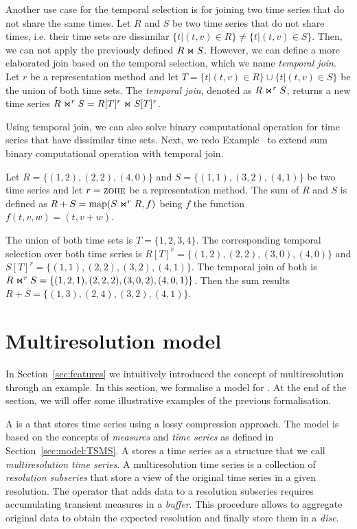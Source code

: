 Another use case for the temporal selection is for joining two time
series that do not share the same times. Let $R$ and $S$ be two time
series that do not share times, i.e. their time sets are dissimilar
$\{t | (t,v) \in R\} \neq \{t | (t,v) \in S\}$. Then, we can not apply
the previously defined $R \Join S$.  However, we can define a more
elaborated join based on the temporal selection, which we name
\emph{temporal join}.  Let $r$ be a representation method and let
$T=\{t | (t,v) \in R\} \cup \{t | (t,v) \in S\}$ be the union of both
time sets.  The \emph{temporal join}, denoted as $R \Join^r S$,
returns a new time series $R \Join^r S = R[T]^r \Join S[T]^r$.

Using temporal join, we can also solve binary computational operation
for time series that have dissimilar time sets. Next, we redo
Example~\label{ex:model:sum} to extend sum binary computational
operation with temporal join.

\begin{example}
  \label{ex:model:sumtemporal}
  Let $R=\{(1,2), (2,2), (4,0)\}$ and $S=\{(1,1), (3,2), (4,1)\}$ be
  two time series and let $r=\zohe{}$ be a representation method.  
  The sum of $R$ and $S$ is defined as $R+S=\operatorname*{map}(S\Join^r R, f)$ being
  $f$ the function $f(t,v,w)=(t,v+ w)$.

  The union of both time sets is $T=\{1,2,3,4\}$. The corresponding
  temporal selection over both time series is $R[T]^r=\{
  (1,2),\allowbreak (2,2), (3,0),\allowbreak (4,0)\}$ and
  $S[T]^r=\{(1,1),\allowbreak (2,2),\allowbreak (3,2), (4,1)\}$.  The
  temporal join of both is $R \Join^r S=\{ (1,2,1),\allowbreak (2,2,2), (3,0,2),
  (4,0,1)\}$.  Then the sum results $R+S= \{(1,3),\allowbreak (2,4), (3,2),
  (4,1)\}$.
\end{example}




\section{Multiresolution model}
\label{sec:MTSMS}

In Section~\ref{sec:features} we intuitively introduced the concept of
multiresolution through an example. In this section, we formalise a
model for . At the end of the section, we will offer some
illustrative examples of the previous formalisation.

A  is a  that stores time series using a lossy
compression approach. The  model is based on the concepts
of \emph{measures} and \emph{time series} as defined in
Section~\ref{sec:model:TSMS}.  A  stores a time series as
a structure that we call \emph{multiresolution time series}. A
multiresolution time series is a collection of \emph{resolution
  subseries} that store a view of the original time series in a given
resolution. The operator that adds data to a resolution subseries
requires accumulating transient measures in a \emph{buffer}. This
procedure allows to aggregate original data to obtain the expected
resolution and finally store them in a \emph{disc}.


